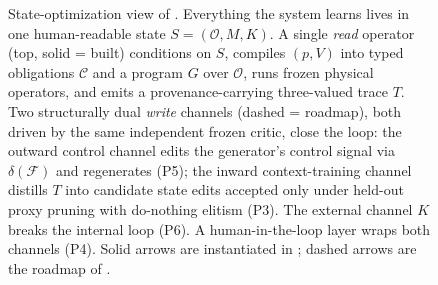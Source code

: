 \begin{figure}[t]
{
}
\caption{State-optimization view of \PhyReAct{}. Everything the system learns
lives in one human-readable state $S=(\mathcal{O},M,K)$. A single \emph{read} operator
(top, solid = built) conditions on $S$, compiles $(p,V)$ into typed obligations
$\mathcal{C}$ and a program $G$ over $\mathcal{O}$, runs frozen physical operators, and emits a
provenance-carrying three-valued trace $T$. Two structurally dual \emph{write}
channels (dashed = roadmap), both driven by the same independent frozen critic,
close the loop: the outward control channel edits the generator's control signal
via $\delta(\mathcal{F})$ and regenerates (P5); the inward context-training channel
distills $T$ into candidate state edits accepted only under held-out proxy
pruning with do-nothing elitism (P3). The external channel $K$ breaks the
internal loop (P6). A human-in-the-loop layer wraps both channels (P4). Solid
arrows are instantiated in ;
dashed arrows are the roadmap of .}
\label{fig:phyreact}
\end{figure}
